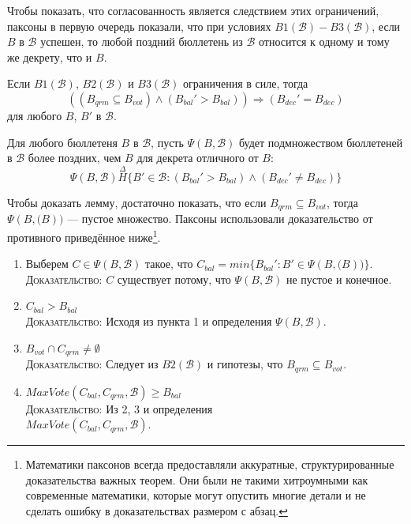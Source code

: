 \documentclass[12pt, a4paper]{article} %
\begin{document}
Чтобы показать, что согласованность является следствием этих ограничений, паксоны в первую очередь показали, что при условиях $B1(\mathcal{B}) - B3(\mathcal{B})$, если $B$ в $\mathcal{B}$ успешен, то любой поздний бюллетень из $\mathcal{B}$ относится к одному и тому же декрету, что и $B$.

\begin{lemma}
Если $B1(\mathcal{B})$, $B2(\mathcal{B})$ и $B3(\mathcal{B})$ ограничения в силе, тогда
\[
    ((B_{qrm} \subseteq B_{vot}) \land (B_{bal}' > B_{bal})) \Rightarrow (B_{dec}' = B_{dec})
\]
для любого $B$, $B'$ в $\mathcal{B}$.
\end{lemma}
\begin{lemmaproof}
Для любого бюллетеня $B$ в $\mathcal{B}$, пусть $\Psi(B, \mathcal{B})$ будет подмножеством бюллетеней в $\mathcal{B}$ более поздних, чем $B$ для декрета отличного от $B$:
\[
    \Psi(B, \mathcal{B}) \overset{\Delta}{H} \{B' \in \mathcal{B} : (B_{bal}' > B_{bal}) \land (B_{dec}' \neq B_{dec})\}
\]

Чтобы доказать лемму, достаточно показать, что если $B_{qrm} \subseteq B_{vot}$, тогда $\Psi(B, \mathcal(B))$ --- пустое множество. Паксоны использовали доказательство от противного приведённое ниже\footnote{Математики паксонов всегда предоставляли аккуратные, структурированные доказательства важных теорем. Они были не такими хитроумными как современные математики, которые могут опустить многие детали и не сделать ошибку в доказательствах размером с абзац.}.
\begin{enumerate}
    \item Выберем $C \in \Psi(B, \mathcal{B})$ такое, что $C_{bal} = min \{B_{bal}' : B' \in \Psi(B, \mathcal(B))\}$. \\
          \textsc{Доказательство}: $C$ существует потому, что $\Psi(B, \mathcal{B})$ не пустое и конечное.
    
    \item $C_{bal} > B_{bal}$\\
          \textsc{Доказательство}: Исходя из пункта 1 и определения $\Psi(B, \mathcal{B})$.

    \item $B_{vot} \cap C_{qrm} \neq \emptyset$\\
          \textsc{Доказательство}: Следует из  $B2(\mathcal{B})$ и гипотезы, что $B_{qrm} \subseteq B_{vot}$.
    
    \item $MaxVote(C_{bal}, C_{qrm}, \mathcal{B}) \geqslant B_{bal}$\\
          \textsc{Доказательство}: Из 2, 3 и определения\\
           $MaxVote(C_{bal}, C_{qrm}, \mathcal{B})$.


\end{enumerate}
\end{lemmaproof}
\end{document}
